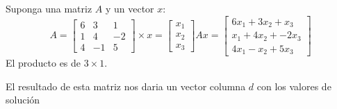 \begin{ejemplo}
    Suponga una matriz \(A\) y un vector \(x\):
    \[
    A = \begin{bmatrix}
        6 & 3 & 1 \\
        1 & 4 & -2 \\
        4 & -1 & 5 
    \end{bmatrix}
    \times
    x = \begin{bmatrix}
        x_1 \\
        x_2 \\ 
        x_3
    \end{bmatrix}
    Ax = \begin{bmatrix}
        6x_1 + 3x_2 + x_3 \\
        x_1 + 4x_2 +- 2x_3 \\
        4x_1 - x_2 + 5x_3
    \end{bmatrix}
    \]
    El producto es de \(3 \times 1\). 

    El resultado de esta matriz nos daria un vector columna \(d\) con los valores de solución
\end{ejemplo}
